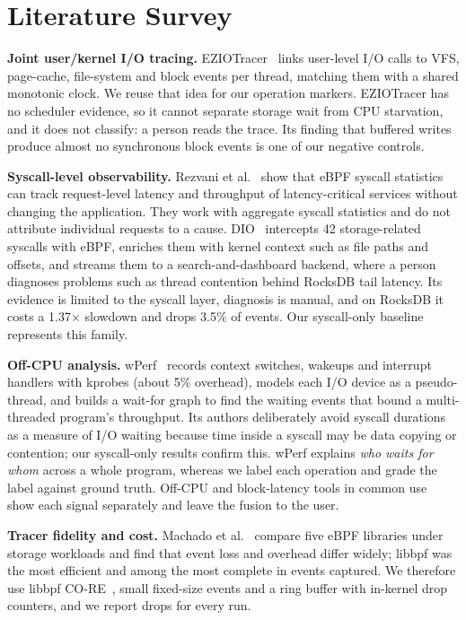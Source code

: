 \documentclass[conference]{IEEEtran}
\begin{document}
\section{Literature Survey}
\textbf{Joint user/kernel I/O tracing.} EZIOTracer~\cite{naas2021eziotracer} links user-level I/O calls to VFS, page-cache, file-system and block events per thread, matching them with a shared monotonic clock. We reuse that idea for our operation markers. EZIOTracer has no scheduler evidence, so it cannot separate storage wait from CPU starvation, and it does not classify: a person reads the trace. Its finding that buffered writes produce almost no synchronous block events is one of our negative controls.

\textbf{Syscall-level observability.} Rezvani et al.~\cite{rezvani2024ispass} show that eBPF syscall statistics can track request-level latency and throughput of latency-critical services without changing the application. They work with aggregate syscall statistics and do not attribute individual requests to a cause. DIO~\cite{esteves2023dio} intercepts 42 storage-related syscalls with eBPF, enriches them with kernel context such as file paths and offsets, and streams them to a search-and-dashboard backend, where a person diagnoses problems such as thread contention behind RocksDB tail latency. Its evidence is limited to the syscall layer, diagnosis is manual, and on RocksDB it costs a 1.37$\times$ slowdown and drops 3.5\% of events. Our syscall-only baseline represents this family.

\textbf{Off-CPU analysis.} wPerf~\cite{zhou2018wperf} records context switches, wakeups and interrupt handlers with kprobes (about 5\% overhead), models each I/O device as a pseudo-thread, and builds a wait-for graph to find the waiting events that bound a multi-threaded program's throughput. Its authors deliberately avoid syscall durations as a measure of I/O waiting because time inside a syscall may be data copying or contention; our syscall-only results confirm this. wPerf explains \emph{who waits for whom} across a whole program, whereas we label each operation and grade the label against ground truth. Off-CPU and block-latency tools in common use~\cite{gregg2019bpf} show each signal separately and leave the fusion to the user.

\textbf{Tracer fidelity and cost.} Machado et al.~\cite{machado2025snowflakes} compare five eBPF libraries under storage workloads and find that event loss and overhead differ widely; libbpf was the most efficient and among the most complete in events captured. We therefore use libbpf CO-RE~\cite{libbpf}, small fixed-size events and a ring buffer with in-kernel drop counters, and we report drops for every run.
\end{document}
